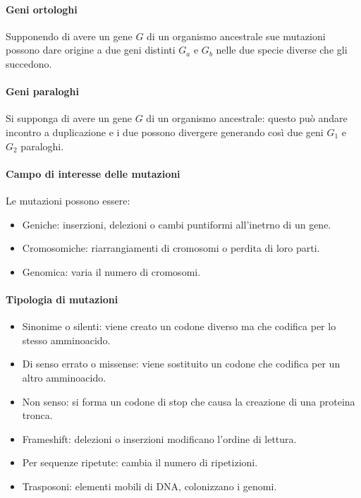 \paragraph{Geni ortologhi}
Supponendo di avere un gene $G$ di un organismo ancestrale sue mutazioni possono dare origine a due geni distinti $G_a$ e $G_b$ nelle due specie diverse che gli succedono.
\paragraph{Geni paraloghi}
Si supponga di avere un gene $G$ di un organismo ancestrale: questo pu\`o andare incontro a duplicazione e i due possono divergere generando cos\`i due geni $G_1$ e $G_2$ paraloghi.

			\paragraph{Campo di interesse delle mutazioni}
			Le mutazioni possono essere:
			\begin{itemize}
				\item Geniche: inserzioni, delezioni o cambi puntiformi all'inetrno di un gene.
				\item Cromosomiche: riarrangiamenti di cromosomi o perdita di loro parti.
				\item Genomica: varia il numero di cromosomi.
			\end{itemize}

			\paragraph{Tipologia di mutazioni}
			\begin{multicols}{2}
				\begin{itemize}
					\item Sinonime o silenti: viene creato un codone diverso ma che codifica per lo stesso amminoacido.
					\item Di senso errato o missense: viene sostituito un codone che codifica per un altro amminoacido.
					\item Non senso: si forma un codone di stop che causa la creazione di una proteina tronca.
					\item Frameshift: delezioni o inserzioni modificano l'ordine di lettura.
					\item Per sequenze ripetute: cambia il numero di ripetizioni.
					\item Trasposoni: elementi mobili di DNA, colonizzano i genomi.
				\end{itemize}
			\end{multicols}

